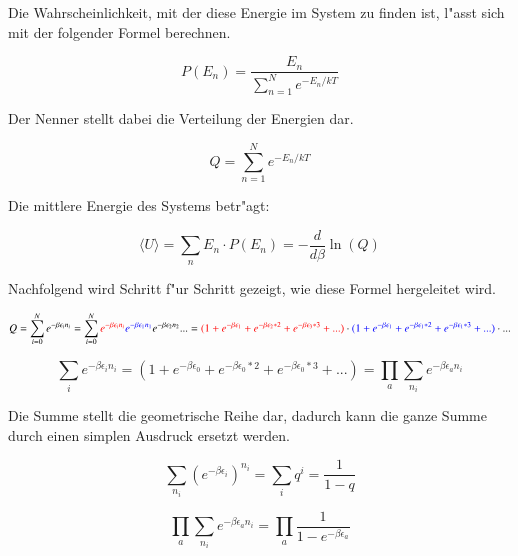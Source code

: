 \begin{refsection}
Die Wahrscheinlichkeit, mit der diese Energie im System zu finden ist, l"asst sich mit der folgender Formel berechnen.

\begin{equation}
    P(E_n) = \frac{E_n}{\sum\limits_{n = 1}^{N} e^{-E_n/kT}}    
\end{equation}

Der Nenner stellt dabei die Verteilung der Energien dar.

\begin{equation}
    Q = \sum\limits_{n = 1}^{N} e^{-E_n/kT}
\end{equation}

Die mittlere Energie des Systems betr"agt:

\begin{equation}
    \langle U \rangle = \sum_{n} E_n \cdot P(E_n) = - \frac{d}{d \beta} \ln (Q)
\end{equation}

Nachfolgend wird Schritt f"ur Schritt gezeigt, wie diese Formel hergeleitet wird.

\begin{equation}
Q = \sum\limits_{i = 0}^{N} e^{- \beta \epsilon_i n_i } 
=  \sum_{i = 0}^{N}  \textcolor{red}{ e^{- \beta \epsilon_i n_i }} \textcolor{blue} {e^{- \beta \epsilon_1 n_1 }} e^{- \beta \epsilon_2 n_2 } ... = \textcolor{red} {(1+e^{- \beta \epsilon_1 }+e^{- \beta \epsilon_2*2  }+e^{- \beta \epsilon_3*3  }+...)} \cdot \textcolor{blue} {(1+e^{- \beta \epsilon_1 }+e^{- \beta \epsilon_1*2  }+e^{- \beta \epsilon_1*3  }+...)} \cdot ...
\end{equation}

\begin{equation}
\sum_{i} e^{- \beta \epsilon_i n_i } = (1+e^{- \beta \epsilon_0 }+e^{- \beta \epsilon_0*2  }+e^{- \beta \epsilon_0*3  }+...) = \prod_{a} \sum_{n_i} e^{- \beta \epsilon_a n_i }
\end{equation}

Die Summe stellt die geometrische Reihe dar, dadurch kann die ganze Summe durch einen simplen Ausdruck ersetzt werden.

\begin{equation}
\sum_{n_i} (e^{- \beta \epsilon_i })^{n_i} = \sum_{i} q^i = \frac {1}{1-q}
\end{equation}

\begin{equation}
    \prod_{a} \sum_{n_i} e^{- \beta \epsilon_a n_i } = \prod_{a} \frac {1}{1-e^{- \beta \epsilon_a}}
\end{equation}


\end{refsection}
